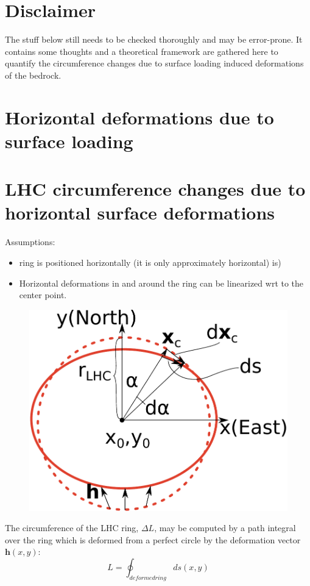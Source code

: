 \documentclass[a4paper,10pt,twoside,openany]{article}
\title{\ititle}
\author{\iauthor}
\begin{document}
\maketitle

\section{Disclaimer}
The stuff below still needs to be checked thoroughly and may be error-prone.
It contains some thoughts and a theoretical framework are gathered here to
quantify the circumference changes due to surface loading induced
deformations of the bedrock.

\section{Horizontal deformations due to surface loading}
\section{LHC circumference changes due to horizontal surface
  deformations}
Assumptions:
\begin{itemize}
\item ring is positioned horizontally (it is only approximately horizontal)
  is)
  \item Horizontal deformations in and around the ring can be
    linearized wrt to the center point.
\end{itemize}
\begin{figure}
\includegraphics[width=\textwidth]{Ringschematically}
\end{figure}
The circumference of the LHC ring,  $\Delta L$, may be computed by a path
integral over the ring which is deformed from a perfect circle by the
deformation vector $\textbf{h}(x,y)$:
\begin{equation}
  L =\oint_{deformed ring} ds(x,y)
  \label{eq:int}
\end{equation}
\end{document}
